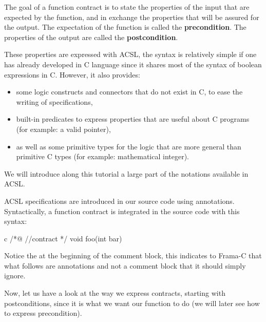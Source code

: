 The goal of a function contract is to state the properties of the input that are
expected by the function, and in exchange the properties that will be assured
for the output. The expectation of the function is called the
\textbf{precondition}. The properties of the output are called the
\textbf{postcondition}.



These properties are expressed with ACSL, the syntax is relatively
simple if one has already developed in C language since it shares most
of the syntax of boolean expressions in C. However, it also provides:



\begin{itemize}
\item
  some logic constructs and connectors that do not exist in C, to ease
  the writing of specifications,
\item
  built-in predicates to express properties that are useful about C
  programs (for example: a valid pointer),
\item
  as well as some primitive types for the logic that are more general
  than primitive C types (for example: mathematical integer).
\end{itemize}



We will introduce along this tutorial a large part of the notations
available in ACSL.



ACSL specifications are introduced in our source code using annotations.
Syntactically, a function contract is integrated in the source code with
this syntax:



\begin{CodeBlock}{c}
/*@
  //contract
*/
void foo(int bar){

}
\end{CodeBlock}



Notice the  at the beginning of the comment block, this
indicates to Frama-C that what follows are annotations and not a comment
block that it should simply ignore.



Now, let us have a look at the way we express contracts, starting with
postconditions, since it is what we want our function to do (we will
later see how to express precondition).





